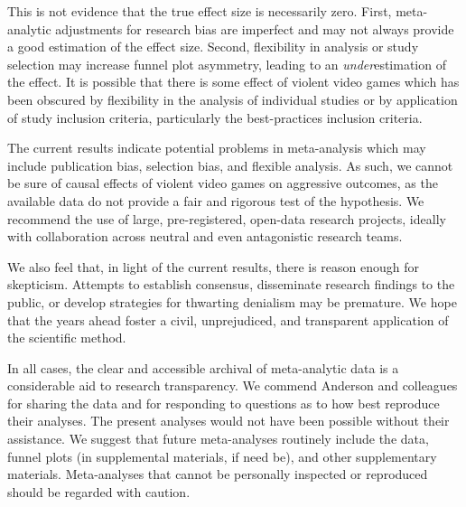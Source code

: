 \documentclass[man]{apa6}
\begin{document}
This is not evidence that the true effect size is necessarily zero. First, meta-analytic adjustments for research bias are imperfect and may not always provide a good estimation of the effect size. Second, flexibility in analysis or study selection may increase funnel plot asymmetry, leading to an {\em under}estimation of the effect. %
It is possible that there is some effect of violent video games which has been obscured by flexibility in the analysis of individual studies or by application of study inclusion criteria, particularly the best-practices inclusion criteria.

The current results indicate potential problems in meta-analysis which may include publication bias, selection bias, and flexible analysis. As such, we cannot be sure of causal effects of violent video games on aggressive outcomes, as the available data do not provide a fair and rigorous test of the hypothesis. We recommend the use of large, pre-registered, open-data research projects, ideally with collaboration across neutral and even antagonistic research teams. 

We also feel that, in light of the current results, there is reason enough for skepticism. Attempts to establish consensus, disseminate research findings to the public, or develop strategies for thwarting denialism may be premature. We hope that the years ahead foster a civil, unprejudiced, and transparent application of the scientific method. 

In all cases, the clear and accessible archival of meta-analytic data is a considerable aid to research transparency. We commend Anderson and colleagues for sharing the data and for responding to questions as to how best reproduce their analyses. The present analyses would not have been possible without their assistance. We suggest that future meta-analyses routinely include the data, funnel plots (in supplemental materials, if need be), and other supplementary materials. Meta-analyses that cannot be personally inspected or reproduced should be regarded with caution.
\end{document}
